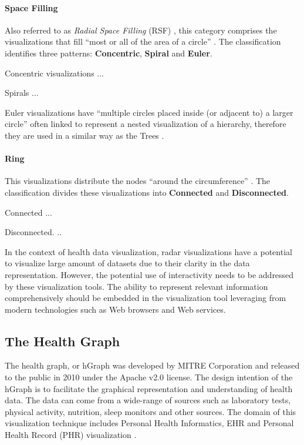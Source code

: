 \documentclass[twocolumn]{bmcart}%
\begin{document}
\paragraph*{Space Filling}
Also referred to as \textit{Radial Space Filling} (RSF) \cite{draper2009survey, yang2002interring}, this category comprises the visualizations that fill ``most or all of the area of a circle'' \cite{draper2009survey}. The classification identifies three patterns: \textbf{Concentric}, \textbf{Spiral} and \textbf{Euler}.

Concentric visualizations ...

Spirals ...

Euler visualizations have ``multiple circles placed inside (or adjacent to) a larger circle'' often linked to represent a nested visualization of a hierarchy, therefore they are used in a similar way as the Trees \cite{draper2009survey}.

\paragraph*{Ring}

This visualizations distribute the nodes ``around the circumference'' \cite{draper2009survey}. The classification divides these visualizations into \textbf{Connected} and \textbf{Disconnected}.

Connected ...

Disconnected. ..


In the context of health data visualization, radar visualizations have a potential to  visualize large amount of datasets due to their clarity in the data representation. However, the potential use of interactivity needs to be addressed by these visualization tools. The ability to represent relevant information comprehensively should be embedded in the visualization tool leveraging from modern technologies such as Web browsers and Web services.

\subsection*{The Health Graph}

The health graph, or hGraph was developed by MITRE Corporation and released to the public in 2010 under the Apache v2.0 license. The design intention of the hGraph is to facilitate the graphical representation and understanding of health data. The data can come from a wide-range of sources such as laboratory tests, physical activity, nutrition, sleep monitors and other sources. The domain of this visualization technique includes Personal Health Informatics, EHR and Personal Health Record (PHR) visualization \cite{follett2012hgraph}.
\end{document}
